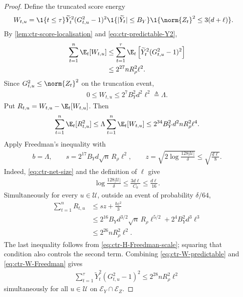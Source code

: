 \begin{proof}
    Define the truncated score energy
    \begin{align}
        W_{t,u}
         & =\1\{t\leq\tau\}
        \widetilde Y_t^2(G_{t,u}^2-1)^2
        \1\{|\widetilde Y_t|\leq B_Y\}
        \1\{\norm{Z_t}^2\leq3(d+\ell)\}.
        \label{eq:ctr-W-definition}
    \end{align}
    By \cref{lem:ctr-score-localisation} and
    \eqref{eq:ctr-predictable-Y2},
    \begin{align}
        \sum_{t=1}^n\E_t[W_{t,u}]
         & \leq
        \sum_{t=1}^{\tau}
        \E_t\left[
            \widetilde Y_t^2(G_{t,u}^2-1)^2
            \right]
        \\
         & \leq2^{27}nR_\rho^2\ell^2.
        \label{eq:ctr-W-predictable}
    \end{align}
    Since $G_{t,u}^2\leq\norm{Z_t}^2$ on the truncation event,
    \begin{align}
        0\leq W_{t,u}
        \leq2^7B_Y^2d^2\ell^2
        \triangleq\Lambda.
        \label{eq:ctr-W-bound}
    \end{align}
    Put $R_{t,u}=W_{t,u}-\E_t[W_{t,u}]$.  Then
    \begin{align}
        \sum_{t=1}^n\E_t[R_{t,u}^2]
        \leq\Lambda\sum_{t=1}^n\E_t[W_{t,u}]
        \leq2^{34}B_Y^2d^2nR_\rho^2\ell^4.
        \label{eq:ctr-W-variance}
    \end{align}
    Apply Freedman's inequality with
    \begin{align}
        b=\Lambda,
        \qquad
        s=2^{17}B_Yd\sqrt n\,R_\rho\ell^2,
        \qquad
        z=\sqrt{2\log\frac{128|\mathcal U|}{\delta}}
        \leq\sqrt{\frac{d\ell}{8}}.
    \end{align}
    Indeed, \eqref{eq:ctr-net-size} and the definition of $\ell$ give
    \begin{align}
        \log\frac{128|\mathcal U|}{\delta}
        \leq\frac{3d\ell}{C_0}
        \leq\frac{d\ell}{16}.
    \end{align}
    Simultaneously for every
    $u\in\mathcal U$, outside an event of probability $\delta/64$,
    \begin{align}
        \sum_{t=1}^nR_{t,u}
         & \leq sz+\frac{bz^2}{3}
        \\
         & \leq
        2^{16}B_Yd^{3/2}\sqrt n\,R_\rho\ell^{5/2}
        +2^4B_Y^2d^3\ell^3
        \\
         & \leq2^{26}nR_\rho^2\ell^2.
        \label{eq:ctr-W-Freedman}
    \end{align}
    The last inequality follows from
    \eqref{eq:ctr-H-Freedman-scale}; squaring that condition also controls
    the second term.  Combining
    \eqref{eq:ctr-W-predictable} and \eqref{eq:ctr-W-Freedman} gives
    \begin{align}
        \sum_{t=1}^{\tau}
        \widetilde Y_t^2(G_{t,u}^2-1)^2
        \leq2^{28}nR_\rho^2\ell^2
        \label{eq:ctr-H-realised-directional-energy}
    \end{align}
    simultaneously for all $u\in\mathcal U$ on
    $\mathcal E_Y\cap\mathcal E_Z$.


\end{proof}
